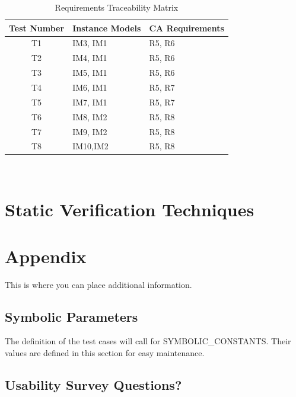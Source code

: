 \documentclass[12pt, titlepage]{article}
\begin{document}
\begin{table} [H]
	\caption{Requirements Traceability Matrix}
	\label{Table:Table_Traceability}  
	\begin{tabular}{|c|p{5cm}|p{5cm}|}
		\hline	
		\textbf{Test Number} & \textbf{Instance Models} & \textbf{CA Requirements}\\
		\hline 
		T1& IM3, IM1& R5, R6\\ \hline
		T2& IM4, IM1& R5, R6\\ \hline
		T3& IM5, IM1& R5, R6\\ \hline
		T4& IM6, IM1& R5, R7\\ \hline
		T5& IM7, IM1& R5, R7\\ \hline
		T6& IM8, IM2& R5, R8\\ \hline
		T7& IM9, IM2& R5, R8\\ \hline
		T8& IM10,IM2& R5, R8\\ \hline
		
	\end{tabular}\\
\end{table}




\section{Static Verification Techniques}

				




\newpage

\section{Appendix}

This is where you can place additional information.

\subsection{Symbolic Parameters}

The definition of the test cases will call for SYMBOLIC\_CONSTANTS.
Their values are defined in this section for easy maintenance.

\subsection{Usability Survey Questions?}

\end{document}
